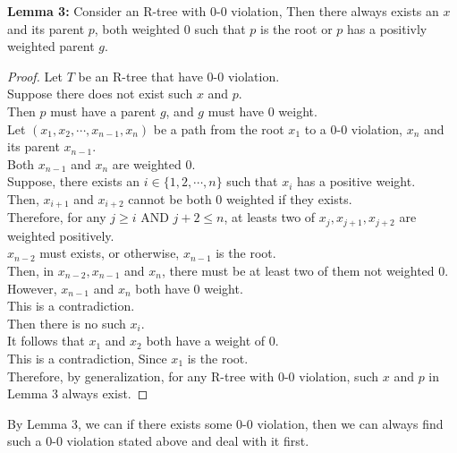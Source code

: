\documentclass[10pt]{article}
\newcommand{\aand}{\mbox{ AND }}
\begin{document}
\begin{enumerate}
	\textbf{Lemma 3:} Consider an R-tree with 0-0 violation, Then there always exists an $x$ and its parent $p$, both weighted 0 such that $p$ is the root or $p$ has a positivly weighted parent $g$. \\
	\begin{proof}
	Let $T$ be an R-tree that have 0-0 violation. \\
	Suppose there does not exist such $x$ and $p$. \\
	Then $p$ must have a parent $g$, and $g$ must have 0 weight. \\
	Let $(x_1, x_2, \cdots, x_{n-1}, x_{n})$ be a path from the root $x_1$ to a 0-0 violation, $x_{n}$ and its parent $x_{n-1}$. \\
	Both $x_{n-1}$ and $x_{n}$ are weighted 0. \\
	Suppose, there exists an $i \in \{1, 2, \cdots, n\}$ such that $x_{i}$ has a positive weight. \\
	Then, $x_{i+1}$ and $x_{i+2}$ cannot be both 0 weighted if they exists. \\
	Therefore, for any $j \geq i \aand j+2 \leq n$, at leasts two of $x_{j}, x_{j+1}, x_{j+2}$ are weighted positively. \\
	$x_{n-2}$ must exists, or otherwise, $x_{n-1}$ is the root. \\
	Then, in $x_{n-2}, x_{n-1}$ and $x_{n}$, there must be at least two of them not weighted 0. \\
	However, $x_{n-1}$ and $x_{n}$ both have 0 weight. \\
	This is a contradiction. \\
	Then there is no such $x_{i}$. \\
	It follows that $x_{1}$ and $x_{2}$ both have a weight of 0. \\
	This is a contradiction, Since $x_{1}$ is the root. \\
	Therefore, by generalization, for any R-tree with 0-0 violation, such $x$ and $p$ in Lemma 3 always exist. 
	\end{proof}

	By Lemma 3, we can if there exists some 0-0 violation, then we can always
	find such a 0-0 violation stated above and deal with it first. \\


\end{enumerate}
\end{document}
